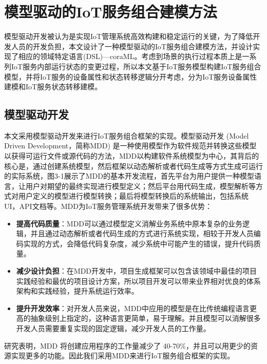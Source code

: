 \documentclass[winfonts,master,twoside]{njuthesis}
\begin{document}
\chapter{模型驱动的IoT服务组合建模方法}

模型驱动开发被认为是实现IoT管理系统高效构建和稳定运行的关键\cite{DBLP:journals/cse/FortinoGRS17}，为了降低开发人员的开发负担，本文设计了一种模型驱动的IoT服务组合建模方法，并设计实现了相应的领域特定语言(DSL)—coraML。考虑到场景的执行过程本质上是一系列IoT服务内部运行状态的变更过程，所以本文基于IoT服务模型构建IoT服务组合模型，并将IoT服务的设备属性和状态转移逻辑分开考虑，分为IoT服务设备属性建模和IoT服务状态转移建模。

\section{模型驱动开发}
本文采用模型驱动开发来进行IoT服务组合框架的实现。模型驱动开发 (Model Driven Development，简称MDD)\cite{kent2002model} 是一种使用模型作为软件规范并转换这些模型以获得可运行文件或源代码的方法，MDD以构建软件系统模型为中心，其背后的核心是，通过创建系统模型，然后框架以动态解析或者代码生成等方式生成可运行的实际系统\cite{volter2009best}，图3-1展示了MDD的基本开发流程，首先平台为用户提供一种模型语言，让用户对期望的最终实现进行模型定义；然后平台用代码生成，模型解析等方式对用户定义的模型进行模型转换；最后将模型转换后的系统输出，包括系统UI，API文档等。MDD为IoT服务管理系统开发带来了很多优势\cite{ModelDrivenSoftwareDevelopment}\cite{domingo2020evaluating}：
\begin{itemize}
    \item \textbf{提高代码质量}：MDD可以通过模型定义消解业务系统中原本复杂的业务逻辑，并且通过动态解析或者代码生成的方式进行系统实现，相较于开发人员编码实现的方式，会降低代码复杂度，减少系统中可能产生的错误，提升代码质量。
    \item \textbf{减少设计负担}：在MDD开发中，项目生成框架可以包含该领域中最佳的项目实践经验和最优的项目设计方案，所以项目开发可以带来业界相对优良的体系架构和实践经验，提升系统运行效率。
    \item \textbf{提升开发效率}：对开发人员来说，MDD中应用的模型是在比传统编程语言更高的抽象级别上指定的，这种语言更简单，易于理解。并且模型可以消解很多开发人员需要重复实现的固定逻辑，减少开发人员的工作量。
\end{itemize}
研究表明，MDD 将创建应用程序的工作量减少了 40-70\%，并且可以用更少的资源实现更多的功能\cite{parviainen2009model}。因此我们采用MDD来进行IoT服务组合框架的实现。

\end{document}
